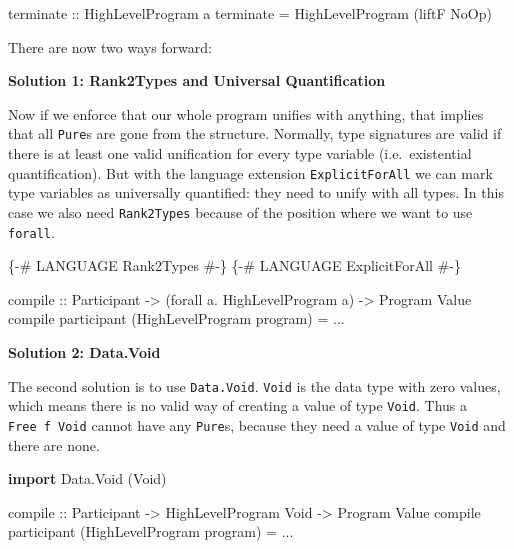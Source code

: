 \documentclass[runningheads,plain]{llncs}
\newenvironment{Shaded}{}{}
\newcommand{\KeywordTok}[1]{\textcolor[rgb]{0.00,0.44,0.13}{\textbf{#1}}}
\newcommand{\DataTypeTok}[1]{\textcolor[rgb]{0.56,0.13,0.00}{#1}}
\newcommand{\OtherTok}[1]{\textcolor[rgb]{0.00,0.44,0.13}{#1}}
\newcommand{\FunctionTok}[1]{\textcolor[rgb]{0.02,0.16,0.49}{#1}}
\newcommand{\NormalTok}[1]{#1}
\begin{document}
\begin{Shaded}
\begin{Highlighting}[]
\OtherTok{terminate ::} \DataTypeTok{HighLevelProgram}\NormalTok{ a}
\NormalTok{terminate }\FunctionTok{=} \DataTypeTok{HighLevelProgram}\NormalTok{ (liftF }\DataTypeTok{NoOp}\NormalTok{)}
\end{Highlighting}
\end{Shaded}

There are now two ways forward:

\textbf{Solution 1: Rank2Types and Universal Quantification}

Now if we enforce that our whole program unifies with anything, that
implies that all \texttt{Pure}s are gone from the structure. Normally,
type signatures are valid if there is at least one valid unification for
every type variable (i.e.~existential quantification). But with the
language extension \texttt{ExplicitForAll} we can mark type variables as
universally quantified: they need to unify with all types. In this case
we also need \texttt{Rank2Types} because of the position where we want
to use \texttt{forall}.

\begin{Shaded}
\begin{Highlighting}[]
\OtherTok{\{-# LANGUAGE Rank2Types #-\}}
\OtherTok{\{-# LANGUAGE ExplicitForAll #-\}}

\OtherTok{compile ::} \DataTypeTok{Participant} \OtherTok{->}\NormalTok{ (forall a}\FunctionTok{.} \DataTypeTok{HighLevelProgram}\NormalTok{ a) }\OtherTok{->} \DataTypeTok{Program} \DataTypeTok{Value}
\NormalTok{compile participant (}\DataTypeTok{HighLevelProgram}\NormalTok{ program) }\FunctionTok{=} \FunctionTok{...}
\end{Highlighting}
\end{Shaded}

\textbf{Solution 2: Data.Void}

The second solution is to use \texttt{Data.Void}. \texttt{Void} is the
data type with zero values, which means there is no valid way of
creating a value of type \texttt{Void}. Thus a \texttt{Free\ f\ Void}
cannot have any \texttt{Pure}s, because they need a value of type
\texttt{Void} and there are none.

\begin{Shaded}
\begin{Highlighting}[]
\KeywordTok{import }\DataTypeTok{Data.Void}\NormalTok{ (}\DataTypeTok{Void}\NormalTok{)}

\OtherTok{compile ::} \DataTypeTok{Participant} \OtherTok{->} \DataTypeTok{HighLevelProgram} \DataTypeTok{Void} \OtherTok{->} \DataTypeTok{Program} \DataTypeTok{Value}
\NormalTok{compile participant (}\DataTypeTok{HighLevelProgram}\NormalTok{ program) }\FunctionTok{=} \FunctionTok{...}
\end{Highlighting}
\end{Shaded}
\end{document}
